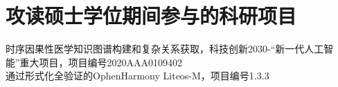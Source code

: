 \chapter{攻读硕士学位期间参与的科研项目}
\noindent [1] 时序因果性医学知识图谱构建和复杂关系获取，科技创新2030-“新一代人工智能”重大项目，项目编号2020AAA0109402\\
\noindent [2] 通过形式化全验证的OphenHarmony Liteos-M，项目编号1.3.3
